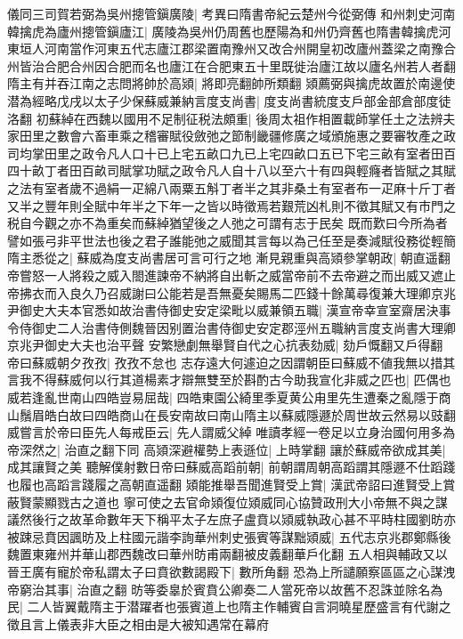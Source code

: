 儀同三司賀若弼為吳州摠管鎭廣陵|{
	考異曰隋書帝紀云楚州今從弼傳}
和州刺史河南韓擒虎為廬州摠管鎭廬江|{
	廣陵為吳州仍周舊也歷陽為和州仍齊舊也隋書韓擒虎河東垣人河南當作河東五代志廬江郡梁置南豫州又改合州開皇初改廬州蓋梁之南豫合州皆治合肥合州因合肥而名也廬江在合肥東五十里既徙治廬江故以廬名州若人者翻}
隋主有并吞江南之志問將帥於高熲|{
	將即亮翻帥所類翻}
熲薦弼與擒虎故置於南邊使潜為經略戊戌以太子少保蘇威兼納言度支尚書|{
	度支尚書統度支戶部金部倉部度徒洛翻}
初蘇綽在西魏以國用不足制征税法頗重|{
	後周太祖作相置載師掌任土之法辨夫家田里之數會六畜車乘之稽審賦役斂弛之節制畿疆修廣之域頒施惠之要審牧產之政司均掌田里之政令凡人口十已上宅五畝口九已上宅四畝口五已下宅三畝有室者田百四十畝丁者田百畝司賦掌功賦之政令凡人自十八以至六十有四與輕癃者皆賦之其賦之法有室者歲不過絹一疋綿八兩粟五斛丁者半之其非桑土有室者布一疋麻十斤丁者又半之豐年則全賦中年半之下年一之皆以時徵焉若艱荒凶札則不徵其賦又有市門之税自今觀之亦不為重矣而蘇綽猶望後之人弛之可謂有志于民矣}
既而歎曰今所為者譬如張弓非平世法也後之君子誰能弛之威聞其言每以為己任至是奏減賦役務從輕簡隋主悉從之|{
	蘇威為度支尚書居可言可行之地}
漸見親重與高熲參掌朝政|{
	朝直遥翻}
帝嘗怒一人將殺之威入閤進諫帝不納將自出斬之威當帝前不去帝避之而出威又遮止帝拂衣而入良久乃召威謝曰公能若是吾無憂矣賜馬二匹錢十餘萬尋復兼大理卿京兆尹御史大夫本官悉如故治書侍御史安定梁毗以威兼領五職|{
	漢宣帝幸宣室齋居決事令侍御史二人治書侍側魏晉因别置治書侍御史安定郡涇州五職納言度支尚書大理卿京兆尹御史大夫也治平聲}
安繁戀劇無舉賢自代之心抗表劾威|{
	劾戶慨翻又戶得翻}
帝曰蘇威朝夕孜孜|{
	孜孜不怠也}
志存遠大何遽迫之因謂朝臣曰蘇威不値我無以措其言我不得蘇威何以行其道楊素才辯無雙至於斟酌古今助我宣化非威之匹也|{
	匹偶也}
威若逢亂世南山四皓豈易屈哉|{
	四皓東園公綺里季夏黄公甪里先生遭秦之亂隱于商山鬚眉皓白故曰四皓商山在長安南故曰南山隋主以蘇威隱遯於周世故云然易以豉翻}
威嘗言於帝曰臣先人每戒臣云|{
	先人謂威父綽}
唯讀孝經一卷足以立身治國何用多為帝深然之|{
	治直之翻下同}
高熲深避權勢上表遜位|{
	上時掌翻}
讓於蘇威帝欲成其美|{
	成其讓賢之美}
聽解僕射數日帝曰蘇威高蹈前朝|{
	前朝謂周朝高蹈謂其隱遯不仕蹈踐也履也高蹈言踐履之高朝直遥翻}
熲能推舉吾聞進賢受上賞|{
	漢武帝詔曰進賢受上賞蔽賢蒙顯戮古之道也}
寧可使之去官命熲復位熲威同心協贊政刑大小帝無不與之謀議然後行之故革命數年天下稱平太子左庶子盧賁以熲威執政心甚不平時柱國劉昉亦被踈忌賁因諷昉及上柱國元諧李詢華州刺史張賓等謀黜熲威|{
	五代志京兆郡鄭縣後魏置東雍州并華山郡西魏改曰華州昉甫兩翻被皮義翻華戶化翻}
五人相與輔政又以晉王廣有寵於帝私謂太子曰賁欲數謁殿下|{
	數所角翻}
恐為上所譴願察區區之心謀洩帝窮治其事|{
	治直之翻}
昉等委辠於賓賁公卿奏二人當死帝以故舊不忍誅並除名為民|{
	二人皆翼戴隋主于潜躍者也張賓道上也隋主作輔賓自言洞曉星歷盛言有代謝之徵且言上儀表非大臣之相由是大被知遇常在幕府}
